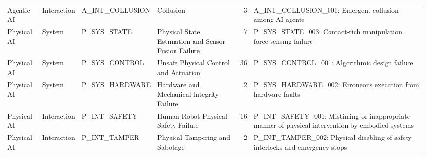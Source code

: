 \begin{longtable}{L{0.09\textwidth}L{0.11\textwidth}L{0.15\textwidth}L{0.23\textwidth}rL{0.24\textwidth}}
Agentic AI & Interaction & A\_INT\_COLLUSION & Collusion & 3 & A\_INT\_COLLUSION\_001: Emergent collusion among AI agents \\
Physical AI & System & P\_SYS\_STATE & Physical State Estimation and Sensor-Fusion Failure & 7 & P\_SYS\_STATE\_003: Contact-rich manipulation force-sensing failure \\
Physical AI & System & P\_SYS\_CONTROL & Unsafe Physical Control and Actuation & 36 & P\_SYS\_CONTROL\_001: Algorithmic design failure \\
Physical AI & System & P\_SYS\_HARDWARE & Hardware and Mechanical Integrity Failure & 2 & P\_SYS\_HARDWARE\_002: Erroneous execution from hardware faults \\
Physical AI & Interaction & P\_INT\_SAFETY & Human-Robot Physical Safety Failure & 16 & P\_INT\_SAFETY\_001: Mistiming or inappropriate manner of physical intervention by embodied systems \\
Physical AI & Interaction & P\_INT\_TAMPER & Physical Tampering and Sabotage & 2 & P\_INT\_TAMPER\_002: Physical disabling of safety interlocks and emergency stops \\
\bottomrule
\end{longtable}
